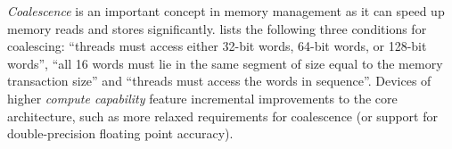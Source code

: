 \textit{Coalescence} is an important concept in memory management as it can speed up memory reads and stores significantly. \cite{cuda} lists the following three conditions for coalescing: ``threads must access either 32-bit words, 64-bit words, or 128-bit words'', ``all 16 words must lie in the same segment of size equal to the memory transaction size'' and ``threads must access the words in sequence''. Devices of higher \textit{compute capability} feature incremental improvements to the core architecture, such as more relaxed requirements for coalescence (or support for double-precision floating point accuracy).